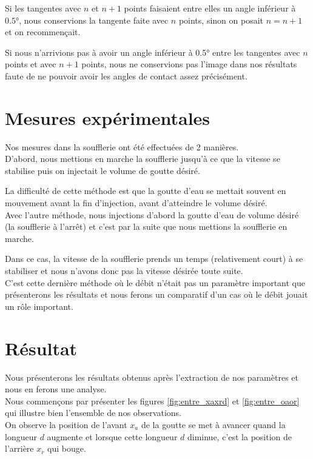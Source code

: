 Si les tangentes avec $n$ et $n+1$ points faisaient entre elles un angle inférieur à $\ang{0.5}$, nous conservions la tangente faite avec $n$ points, sinon on posait $n = n+1$ et on recommençait.

Si nous n'arrivions pas à avoir un angle inférieur à \ang{0.5}  entre les tangentes avec $n$ points et avec $n+1$ points, nous ne conservions pas l'image dans nos résultats faute de ne pouvoir avoir les angles de contact assez précisément.

\section{Mesures expérimentales}

Nos mesures dans la soufflerie ont été effectuées de 2 manières.\\

D'abord, nous mettions en marche la soufflerie jusqu'à ce que la vitesse se stabilise puis on injectait le volume de goutte désiré.

La difficulté de cette méthode est que la goutte d'eau se mettait souvent en mouvement avant la fin d'injection, avant d'atteindre le volume désiré.\\

Avec l'autre méthode, nous injections d'abord la goutte d'eau de volume désiré (la soufflerie à l'arrêt) et c'est par la suite que nous mettions la soufflerie en marche.

Dans ce cas, la vitesse de la soufflerie prends un temps (relativement court) à se stabiliser et nous n'avons donc pas la vitesse désirée toute suite.\\

C'est cette dernière méthode où le débit n'était pas un paramètre important que présenterons les résultats et nous ferons un comparatif d'un cas où le débit jouait un rôle important.
\newpage
\section{Résultat}

Nous présenterons les résultats obtenus après l'extraction de nos paramètres et nous en ferons une analyse.\\
Nous commençons par présenter les figures \ref{fig:entre_xaxrd} et \ref{fig:entre_oaor} qui illustre bien l'ensemble de nos observations.\\

On observe la position de l'avant $x_{a}$ de la goutte se met à avancer quand la longueur $d$ augmente et lorsque cette longueur $d$ diminue, c'est la position de l'arrière $x_{r}$ qui bouge.

